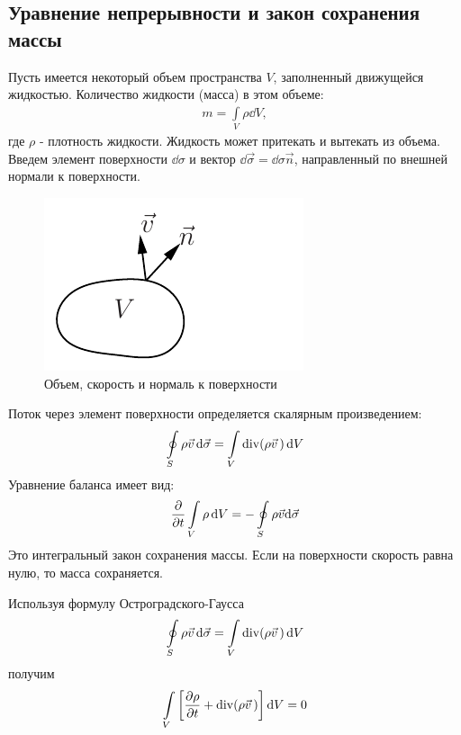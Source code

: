 \subsection{Уравнение непрерывности и закон сохранения массы}
Пусть имеется некоторый объем пространства $V$, заполненный движущейся  жидкостью. Количество жидкости (масса) в этом объеме:
\begin{align*} 
m=\int\limits_{V} \rho\dd{V},
\end{align*}
где $\rho$ - плотность жидкости. Жидкость может притекать и вытекать из объема. Введем элемент поверхности $ \dd\sigma $ и вектор $ \dd \vec{\sigma}=\dd\sigma \vec{n} $, направленный по внешней нормали к поверхности. 
\begin{figure}[H]
	\vspace{-10pt}
	\centering
	\includegraphics[scale=1]{photo/4.pdf}
	\caption{Объем, скорость и нормаль к поверхности}
	\label{fig:figure4}
\end{figure}
Поток через элемент поверхности определяется скалярным произведением:
\begin{align*}
\oint\limits_{S} \rho \vec{v}\, \dd\vec{\sigma}=\int\limits_{V} \operatorname{div}(\rho \vec{v}\,)\dd{V}
\end{align*}
Уравнение баланса имеет вид: 
\begin{align*} 
\pdv{t} \int\limits_{V} \rho\dd{V}=-\oint\limits_{S} \rho \vec{v} \dd\vec{\sigma}
\end{align*}
Это интегральный закон сохранения массы. Если на поверхности скорость равна нулю, то масса сохраняется.

Используя формулу Остроградского-Гаусса
\begin{align*} 
\oint\limits_{S} \rho \vec{v}\, \dd \vec{\sigma}=\int\limits_{V} \operatorname{div} (\rho \vec{v}\,)\dd{V}
\end{align*}
получим 
\begin{align*} 
\int\limits_{V}\left[\frac{\partial \rho}{\partial t}+\operatorname{div}(\rho \vec{v}\,)\right]\dd{V}=0
\end{align*}

